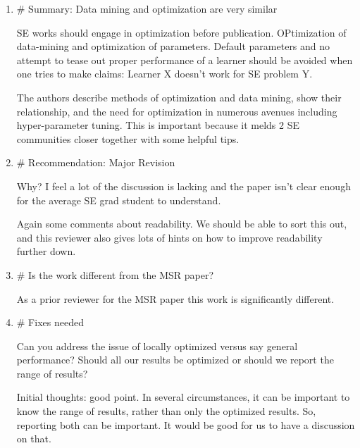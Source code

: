 \documentclass{article}
\newenvironment{com}{\color{blue}\begin{itshape}}{\end{itshape}\vspace{1ex}}
\begin{document}
\begin{enumerate}

\item \begin{com}\# Summary: Data mining and optimization are very similar

SE works should engage in optimization before publication.
OPtimization of data-mining and optimization of parameters. Default
parameters and no attempt to tease out proper performance of a learner
should be avoided when one tries to make claims: Learner X doesn't
work for SE problem Y.

The authors describe methods of optimization and data mining, show
their relationship, and the need for optimization in numerous avenues
including hyper-parameter tuning. This is important because it melds 2
SE communities closer together with some helpful tips.
\end{com}

\item \begin{com}
\# Recommendation: Major Revision

Why? I feel a lot of the discussion is lacking and the paper isn't
clear enough for the average SE grad student to understand.
\end{com}

Again some comments about readability. We should be able to sort this out, and this reviewer also gives lots of hints on how to improve readability further down.

\item \begin{com}
\# Is the work different from the MSR paper?

As a prior reviewer for the MSR paper this work is significantly
different.
\end{com}

\item \begin{com}
\# Fixes needed

Can you address the issue of locally optimized versus say general
performance? Should all our results be optimized or should we report
the range of results?
\end{com}

Initial thoughts: good point. In several circumstances, it can be important to know the range of results, rather than only the optimized results. So, reporting both can be important. It would be good for us to have a discussion on that.


\end{enumerate}
\end{document}
